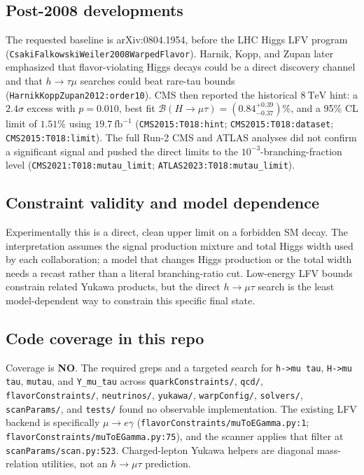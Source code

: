 \subsection*{Post-2008 developments}
The requested baseline is arXiv:0804.1954, before the LHC Higgs LFV program
(\texttt{CsakiFalkowskiWeiler2008WarpedFlavor}).  Harnik, Kopp, and Zupan
later emphasized that flavor-violating Higgs decays could be a direct discovery
channel and that \(h\to\tau\mu\) searches could beat rare-tau bounds
(\texttt{HarnikKoppZupan2012:order10}).  CMS then reported the historical
\(8~\mathrm{TeV}\) hint: a \(2.4\sigma\) excess with \(p=0.010\), best fit
\(\mathcal{B}(H\to\mu\tau)=(0.84^{+0.39}_{-0.37})\%\), and a 95\% CL limit
of \(1.51\%\) using \(19.7~\mathrm{fb}^{-1}\)
(\texttt{CMS2015:T018:hint}; \texttt{CMS2015:T018:dataset};
\texttt{CMS2015:T018:limit}).  The full Run-2 CMS and ATLAS analyses did not
confirm a significant signal and pushed the direct limits to the
\(10^{-3}\)-branching-fraction level (\texttt{CMS2021:T018:mutau\_limit};
\texttt{ATLAS2023:T018:mutau\_limit}).

\subsection*{Constraint validity and model dependence}
Experimentally this is a direct, clean upper limit on a forbidden SM decay.
The interpretation assumes the signal production mixture and total Higgs width
used by each collaboration; a model that changes Higgs production or the total
width needs a recast rather than a literal branching-ratio cut.  Low-energy
LFV bounds constrain related Yukawa products, but the direct \(h\to\mu\tau\)
search is the least model-dependent way to constrain this specific final state.

\subsection*{Code coverage in this repo}
Coverage is \textbf{NO}.  The required greps and a targeted search for
\texttt{h->mu tau}, \texttt{H->mu tau}, \texttt{mutau}, and \texttt{Y\_mu\_tau}
across \texttt{quarkConstraints/}, \texttt{qcd/}, \texttt{flavorConstraints/},
\texttt{neutrinos/}, \texttt{yukawa/}, \texttt{warpConfig/}, \texttt{solvers/},
\texttt{scanParams/}, and \texttt{tests/} found no observable implementation.
The existing LFV backend is specifically \(\mu\to e\gamma\)
(\texttt{flavorConstraints/muToEGamma.py:1};
\texttt{flavorConstraints/muToEGamma.py:75}), and the scanner applies that
filter at \texttt{scanParams/scan.py:523}.  Charged-lepton Yukawa helpers are
diagonal mass-relation utilities, not an \(h\to\mu\tau\) prediction.

